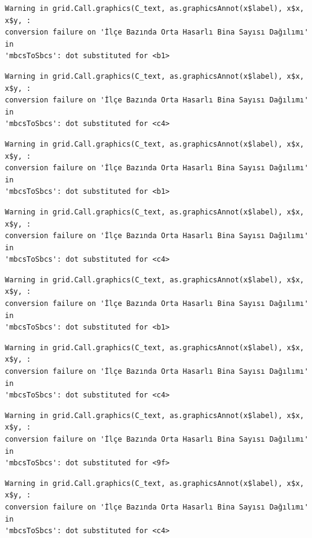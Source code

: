 \documentclass[
  11pt,
  a4paper,
  DIV=11,
  numbers=noendperiod]{scrartcl}
\begin{document}
\begin{verbatim}
Warning in grid.Call.graphics(C_text, as.graphicsAnnot(x$label), x$x, x$y, :
conversion failure on 'İlçe Bazında Orta Hasarlı Bina Sayısı Dağılımı' in
'mbcsToSbcs': dot substituted for <b1>
\end{verbatim}

\begin{verbatim}
Warning in grid.Call.graphics(C_text, as.graphicsAnnot(x$label), x$x, x$y, :
conversion failure on 'İlçe Bazında Orta Hasarlı Bina Sayısı Dağılımı' in
'mbcsToSbcs': dot substituted for <c4>
\end{verbatim}

\begin{verbatim}
Warning in grid.Call.graphics(C_text, as.graphicsAnnot(x$label), x$x, x$y, :
conversion failure on 'İlçe Bazında Orta Hasarlı Bina Sayısı Dağılımı' in
'mbcsToSbcs': dot substituted for <b1>
\end{verbatim}

\begin{verbatim}
Warning in grid.Call.graphics(C_text, as.graphicsAnnot(x$label), x$x, x$y, :
conversion failure on 'İlçe Bazında Orta Hasarlı Bina Sayısı Dağılımı' in
'mbcsToSbcs': dot substituted for <c4>
\end{verbatim}

\begin{verbatim}
Warning in grid.Call.graphics(C_text, as.graphicsAnnot(x$label), x$x, x$y, :
conversion failure on 'İlçe Bazında Orta Hasarlı Bina Sayısı Dağılımı' in
'mbcsToSbcs': dot substituted for <b1>
\end{verbatim}

\begin{verbatim}
Warning in grid.Call.graphics(C_text, as.graphicsAnnot(x$label), x$x, x$y, :
conversion failure on 'İlçe Bazında Orta Hasarlı Bina Sayısı Dağılımı' in
'mbcsToSbcs': dot substituted for <c4>
\end{verbatim}

\begin{verbatim}
Warning in grid.Call.graphics(C_text, as.graphicsAnnot(x$label), x$x, x$y, :
conversion failure on 'İlçe Bazında Orta Hasarlı Bina Sayısı Dağılımı' in
'mbcsToSbcs': dot substituted for <9f>
\end{verbatim}

\begin{verbatim}
Warning in grid.Call.graphics(C_text, as.graphicsAnnot(x$label), x$x, x$y, :
conversion failure on 'İlçe Bazında Orta Hasarlı Bina Sayısı Dağılımı' in
'mbcsToSbcs': dot substituted for <c4>
\end{verbatim}
\end{document}
